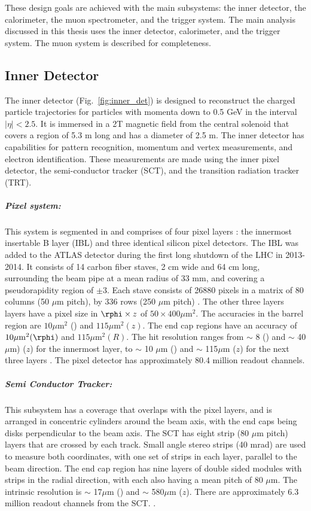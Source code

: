 These design goals are achieved with the main subsystems: the inner detector, the calorimeter, the muon spectrometer, and the trigger system. The main analysis discussed in this thesis uses the inner detector, calorimeter, and the trigger system. The muon system is described for completeness.


\subsection{Inner Detector}
The inner detector (Fig.~\ref{fig:inner_det}) is designed to reconstruct the charged particle trajectories for particles with momenta down to 0.5 GeV in the interval $|\eta| < 2.5$. It is immersed in a 2T magnetic field from the central solenoid that covers a region of 5.3 m long and has a diameter of 2.5 m. The inner detector has capabilities for pattern recognition, momentum and vertex measurements, and electron identification. These measurements are made using the inner pixel detector, the semi-conductor tracker (SCT), and the transition radiation tracker (TRT). 

\subparagraph{Pixel system: } This system is segmented in \rphi and comprises of four pixel layers : the innermost insertable B layer (IBL) and three identical silicon pixel detectors. The IBL was added to the ATLAS detector during the first long shutdown of the LHC in 2013-2014. It consists of 14 carbon fiber staves, 2 cm wide and 64 cm long, surrounding the beam pipe at a mean radius of 33 mm, and covering a pseudorapidity region of $\pm 3$. Each stave consists of 26880 pixels in a matrix of 80 columns (50 $\mu$m pitch), by 336 rows (250 $\mu$m pitch) \cite{LaRosa:2016nbd, Capeans:1291633}. 
The other three layers layers have a pixel size in $\rphi \times z$ of $50 \times 400 \mu \mathrm{m}^2$. The accuracies in the barrel region are $10 \mu \mathrm{m}^2$ (\rphi) and $115 \mu \mathrm{m}^2 (z)$. The end cap regions have an accuracy of $10 \mu \mathrm{m}^2 (\rphi) $ and $115 \mu \mathrm{m}^2 (R)$. The hit resolution ranges from $\sim$ 8 (\rphi) and $\sim$ 40$\mu$m) ($z$) for the innermost layer, to $\sim$ 10 $\mu$m (\rphi) and $\sim$ 115$\mu$m ($z$) for the next three layers \cite{Aad:2008zzm}. The pixel detector has approximately 80.4 million readout channels. 

\subparagraph{Semi Conductor Tracker:} This subsystem has a coverage that overlaps with the pixel layers, and is arranged in concentric cylinders around the beam axis, with the end caps being disks perpendicular to the beam axis. The SCT has eight strip (80 $\mu$m pitch) layers that are crossed by each track. Small angle stereo strips (40 mrad) are used to measure both coordinates, with one set of strips in each layer, parallel to the beam direction. The end cap region has nine layers of double sided modules with strips in the radial direction, with each also having a mean pitch of 80 $\mu$m. The intrinsic resolution is $\sim$ 17$\mu$m (\rphi) and $\sim$ 580$\mu$m ($z$). There are approximately 6.3 million readout channels from the SCT.  \cite{Aad:2008zzm}.


